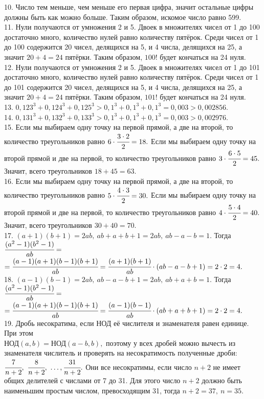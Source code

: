 10. Число тем меньше, чем меньше его первая цифра, значит остальные цифры должны быть как можно больше. Таким образом, искомое число равно 599.\\
11. Нули получаются от умножения 2 и 5. Двоек в множителях чисел от 1 до 100 достаточно много, количество нулей равно количеству пятёрок. Среди чисел от 1 до 100 содержится 20 чисел, делящихся на 5, и 4 числа, делящихся на 25, а значит $20+4=24$ пятёрки. Таким образом, $100!$ будет кончаться на 24 нуля.\\
12. Нули получаются от умножения 2 и 5. Двоек в множителях чисел от 1 до 101 достаточно много, количество нулей равно количеству пятёрок. Среди чисел от 1 до 101 содержится 20 чисел, делящихся на 5, и 4 числа, делящихся на 25, а значит $20+4=24$ пятёрки. Таким образом, $101!$ будет кончаться на 24 нуля.\\
13. $0,123^3+0,124^3+0,125^3>0,1^3+0,1^3+0,1^3=0,003>0,002856.$\\
14. $0,131^3+0,132^3+0,133^3>0,1^3+0,1^3+0,1^3=0,003>0,002976.$\\
15. Если мы выбираем одну точку на первой прямой, а две на второй, то количество треугольников равно $6\cdot\cfrac{3\cdot2}{2}=18.$ Если мы выбираем одну точку на второй прямой и две на первой, то количество треугольников равно $3\cdot\cfrac{6\cdot5}{2}=45.$ Значит, всего треугольников $18+45=63.$\\
16. Если мы выбираем одну точку на первой прямой, а две на второй, то количество треугольников равно $5\cdot\cfrac{4\cdot3}{2}=30.$ Если мы выбираем одну точку на второй прямой и две на первой, то количество треугольников равно $4\cdot\cfrac{5\cdot4}{2}=40.$ Значит, всего треугольников $30+40=70.$\\
17. $(a+1)(b+1)=2ab,\ ab+a+b+1=2ab,\ ab-a-b=1.$ Тогда $\cfrac{(a^2-1)(b^2-1)}{ab}=$\\$=\cfrac{(a-1)(a+1)(b-1)(b+1)}{ab}=\cfrac{(a+1)(b+1)}{ab}\cdot(ab-a-b+1)=2\cdot2=4.$\\
18. $(a-1)(b-1)=2ab,\ ab-a-b+1=2ab,\ ab+a+b=1.$ Тогда $\cfrac{(a^2-1)(b^2-1)}{ab}=$\\$=\cfrac{(a-1)(a+1)(b-1)(b+1)}{ab}=\cfrac{(a-1)(b-1)}{ab}\cdot(ab+a+b+1)=2\cdot2=4.$\\
19. Дробь несократима, если НОД её числителя и знаменателя равен единице. При этом\\ НОД$(a,b)=$НОД$(a-b,b),$ поэтому у всех дробей можно вычесть из знаменателя числитель и проверять на несократимость полученные дроби: $\cfrac{7}{n+2},\ \cfrac{8}{n+2},\ \ldots, \cfrac{31}{n+2}.$ Они все несократимы, если число $n+2$ не имеет общих делителей с числами от 7 до 31. Для этого число $n+2$ должно быть наименьшим простым числом, превосходящим 31, тогда $n+2=37,\ n=35.$\\
